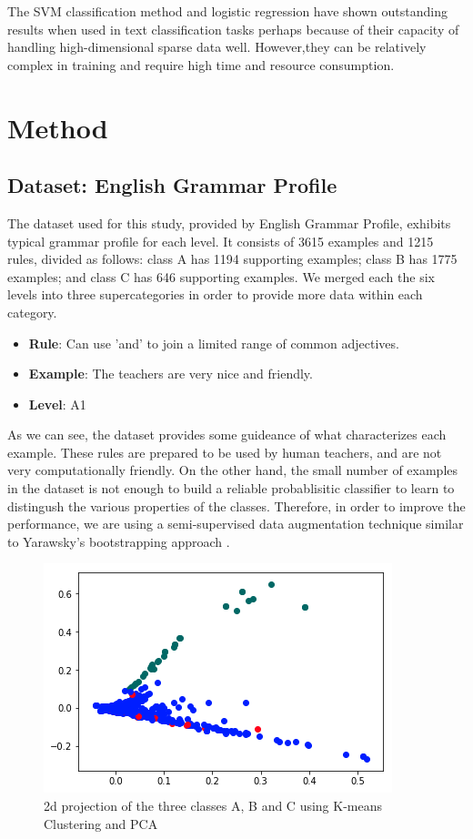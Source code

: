 The SVM classification method and logistic regression have shown outstanding results when used in text classification tasks \citep{Yang1999ARO} \citep{brucher2002document} perhaps because of their capacity of handling high-dimensional sparse data well.  However,they can be relatively complex in training and require high time and resource consumption.



\section{Method}
\label{sec:logistic}

\subsection{Dataset: English Grammar Profile}
The dataset used for this study, provided by English Grammar Profile, exhibits typical grammar profile for each level. It consists of 3615 examples and 1215 rules, divided as follows: class A has 1194 supporting examples; class B has 1775 examples; and class C has 646 supporting examples. We merged each the six levels into three supercategories in order to provide more data within each category. 

\begin{itemize}
	\item \textbf{Rule}: Can use 'and' to join a limited range of common adjectives.
	\item \textbf{Example}: The teachers are very nice and friendly.
	\item \textbf{Level}: A1
\end{itemize}
As we can see, the dataset provides some guideance of what characterizes each example. These rules are prepared to be used by human teachers, and are not very computationally friendly. On the other hand, the small number of examples in the dataset is not enough to build a reliable probablisitic classifier to learn to distingush the various properties of the classes. Therefore, in order to improve the performance, we are using a semi-supervised data augmentation technique similar to Yarawsky's bootstrapping approach \citep{yarowsky_unsupervised_1995}. 

\begin{figure}[t]
	\centering
    \includegraphics[width=.75\linewidth]{../Figures/pca_proj.png} 
	\caption{2d projection of the three classes A, B and C using K-means Clustering and PCA}
	\label{fig:cmdstudy}
\end{figure}

